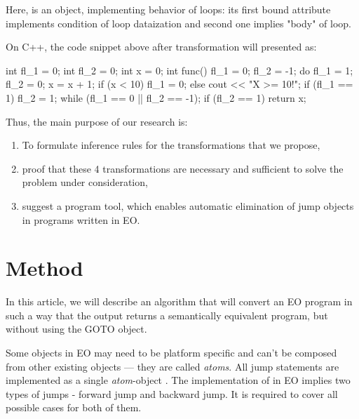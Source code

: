 \documentclass[sigplan,review,11pt,nonacm,natbib=false]{acmart}
\theoremstyle{theorems}
\newcounter{rule}
\begin{document}
    Here,  is an object, implementing behavior of loops: its first bound attribute implements condition of loop dataization and second one implies "body" of loop.

    On C++, the code snippet above after transformation will presented as:
    \begin{ffcode}
        int fl_1 = 0;
        int fl_2 = 0;
        int x = 0;
        int func() {
            fl_1 = 0;
            fl_2 = -1;
            do {
                fl_1 = 1;
                fl_2 = 0;
                x = x + 1;
                if (x < 10)
                fl_1 = 0;
                else
                cout << "X >= 10!\n";
                if (fl_1 == 1)
                fl_2 = 1;
            } while (fl_1 == 0 || fl_2 == -1);
            if (fl_2 == 1)
            return x;
        }
    \end{ffcode}



    Thus, the main purpose of our research is:
    \begin{enumerate}
        \item To formulate inference rules for the transformations that we propose,
        \item proof that these 4 transformations are necessary and sufficient to solve the problem under consideration,
        \item suggest a program tool, which
        enables automatic elimination of jump objects in programs written in EO.
    \end{enumerate}



    \section{Method}
    In this article, we will describe an algorithm that will convert an EO program in such a way that the output returns a semantically equivalent program, but without using the GOTO object.

    Some objects in EO may need to be platform specific and can’t be composed from other existing objects — they are called \emph{atoms}.
    All jump statements are implemented as a
    single \emph{atom}-object .
    The implementation of  in EO implies two types of jumps - forward jump and backward jump.
    It is required to cover all possible cases for both of them.
\end{document}
